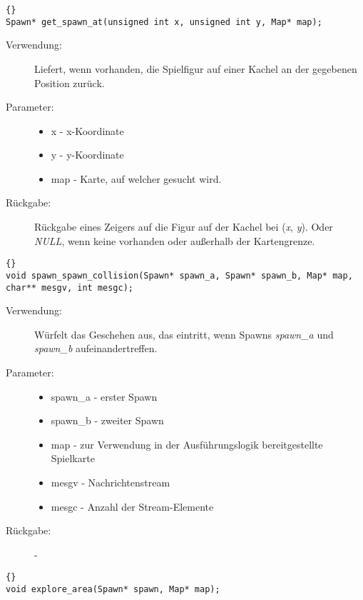 \documentclass[11pt,a4paper,notitlepage]{report}
\begin{document}
		\begin{lstlisting}[caption=get\_spawn\_at]{}
Spawn* get_spawn_at(unsigned int x, unsigned int y, Map* map);
		\end{lstlisting}
		
	\begin{description}
		\item[Verwendung:] Liefert, wenn vorhanden, die Spielfigur auf einer Kachel an der gegebenen Position zurück.
		\item[Parameter:] \hfill
		\begin{itemize}
			\item x - x-Koordinate
			\item y - y-Koordinate
			\item map - Karte, auf welcher gesucht wird.
		\end{itemize}
		\item[Rückgabe:] Rückgabe eines Zeigers auf die Figur auf der Kachel bei (\textit{x}, \textit{y}). Oder \textit{NULL}, wenn keine vorhanden oder außerhalb der Kartengrenze.
	\end{description}
	
	\begin{lstlisting}[caption=spawn\_spawn\_collision]{}
void spawn_spawn_collision(Spawn* spawn_a, Spawn* spawn_b, Map* map, 
char** mesgv, int mesgc);
		\end{lstlisting}
		
	\begin{description}
		\item[Verwendung:] Würfelt das Geschehen aus, das eintritt, wenn Spawns \textit{spawn\_a} und \textit{spawn\_b} aufeinandertreffen.
		\item[Parameter:] \hfill
		\begin{itemize}
			\item spawn\_a - erster Spawn
			\item spawn\_b - zweiter Spawn
			\item map - zur Verwendung in der Ausführungslogik bereitgestellte Spielkarte
			\item mesgv - Nachrichtenstream
			\item mesgc - Anzahl der Stream-Elemente
		\end{itemize}
		\item[Rückgabe:] -
	\end{description}
	
		\begin{lstlisting}[caption=explore\_area]{}
void explore_area(Spawn* spawn, Map* map);
		\end{lstlisting}
		
\end{document}

